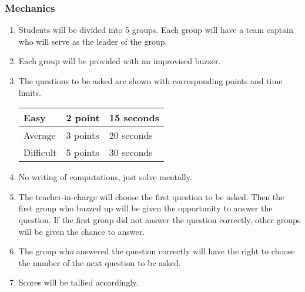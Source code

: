\subsubsection*{Mechanics}
\begin{enumerate}
\item Students will be divided into 5 groups. Each group will have a team captain who will serve as
the leader of the group.
\item Each group will be provided with an improvised buzzer.
\item The questions to be asked are shown with corresponding points and time limits.
\begin{center}
\begin{tabular}{|l|l|l|}
\hline
Easy & 2 point & 15 seconds\\ \hline
Average & 3 points & 20 seconds\\ \hline
Difficult & 5 points & 30 seconds\\ \hline
\end{tabular}
\end{center}
\item No writing of computations, just solve mentally.
\item The teacher-in-charge will choose the first question to be asked. Then the first group who
buzzed up will be given the opportunity to answer the question. If the first group did not
answer the question correctly, other groups will be given the chance to answer.
\item The group who answered the question correctly will have the right to choose the number of
the next question to be asked.
\item Scores will be tallied accordingly.
\end{enumerate}
